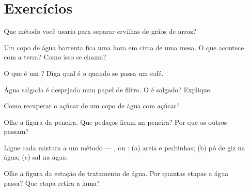 \section{Exercícios}

\begin{exercise}[$\star$]\label{exo:g3:separating-mixtures:1}
Que método você usaria para separar ervilhas de grãos de arroz?
\end{exercise}

\begin{exercise}[$\star$]\label{exo:g3:separating-mixtures:2}
Um copo de água barrenta fica uma hora em cima de uma mesa. O que
acontece com a terra? Como isso se chama?
\end{exercise}

\begin{exercise}[$\star$]\label{exo:g3:separating-mixtures:3}
O que é um ? Diga qual é o  quando se passa um café.
\end{exercise}

\begin{exercise}[$\star$]\label{exo:g3:separating-mixtures:4}
Água salgada é despejada num papel de filtro. O  é salgado?
Explique.
\end{exercise}

\begin{exercise}[$\star$]\label{exo:g3:separating-mixtures:5}
Como recuperar o açúcar de um copo de água com açúcar?
\end{exercise}

\begin{exercise}[$\star$]\label{exo:g3:separating-mixtures:6}
Olhe a figura da peneira. Que pedaços ficam na peneira? Por que os
outros passam?
\end{exercise}

\begin{exercise}[$\star$]\label{exo:g3:separating-mixtures:7}
Ligue cada mistura a um método --- ,  ou :
(a) areia e pedrinhas; (b) pó de giz na água; (c) sal na água.
\end{exercise}

\begin{exercise}[$\star$]\label{exo:g3:separating-mixtures:8}
Olhe a figura da estação de tratamento de água. Por quantas etapas a
água passa? Que etapa retira a lama?
\end{exercise}

